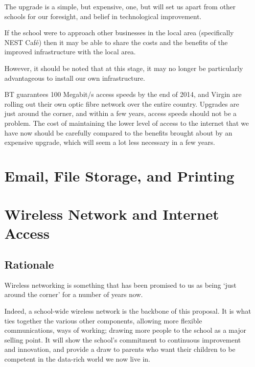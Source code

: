 \documentclass[a4paper,leqno,titlepage]{article}
\begin{document}
The upgrade is a simple, but expensive, one, but will set us apart from other
schools for our foresight, and belief in technological improvement.


If the school were to approach other businesses in the local area (specifically
NEST Café) then it may be able to share the costs and the benefits of the
improved infrastructure with the local area.


However, it should be noted that at this stage, it may no longer be particularly
advantageous to install our own infrastructure.

BT guarantees 100 Megabit/s access speeds by the end of 2014,
and Virgin are rolling out their own optic fibre network over
the entire country. Upgrades are just around the corner, and within a few years,
access speeds should not be a problem. The cost of maintaining the lower level
of access to the internet that we have now should be carefully compared to
the benefits brought about by an expensive upgrade, which will seem a lot less
necessary in a few years.







\section{Email, File Storage, and Printing}



















\section{Wireless Network and Internet Access}


\subsection{Rationale}

Wireless networking is something that has been promised to us as being `just
around the corner' for a number of years now.


Indeed, a school-wide wireless network is the backbone of this proposal. It is
what ties together the various other components, allowing more flexible
communications, ways of working; drawing more people to the school as a
major selling point. It will show the school's commitment to continuous
improvement and innovation, and provide a draw to parents who want their
children to be competent in the data-rich world we now live in.
\end{document}
